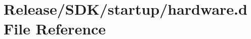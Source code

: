 \hypertarget{_release_2_s_d_k_2startup_2hardware_8d}{}\section{Release/\+S\+D\+K/startup/hardware.d File Reference}
\label{_release_2_s_d_k_2startup_2hardware_8d}
